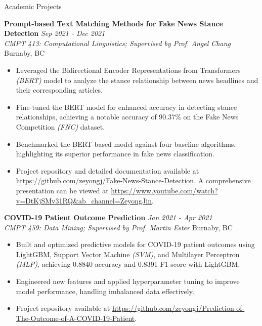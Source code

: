 \documentclass{resume} %
\begin{document}
\begin{rSection}{Academic Projects}


{\bf Prompt-based Text Matching Methods for Fake News Stance Detection} \hfill {\em Sep 2021 - Dec 2021} 
\\{\textit{CMPT 413: Computational Linguistics; Supervised by Prof. Angel Chang} \hfill {Burnaby, BC}}
\begin{itemize}
    \vspace{-0.2cm} \item Leveraged the Bidirectional Encoder Representations from Transformers \textit{(BERT)} model to analyze the stance relationship between news headlines and their corresponding articles.
    \vspace{-0.2cm} \item Fine-tuned the BERT model for enhanced accuracy in detecting stance relationships, achieving a notable accuracy of 90.37\% on the Fake News Competition \textit{(FNC)} dataset.
    \vspace{-0.2cm} \item Benchmarked the BERT-based model against four baseline algorithms, highlighting its superior performance in fake news classification.
    \vspace{-0.2cm} \item Project repository and detailed documentation available at \url{https://github.com/zeyongj/Fake-News-Stance-Detection}. A comprehensive presentation can be viewed at \url{https://www.youtube.com/watch?v=DtKjSMv31RQ&ab_channel=ZeyongJin}.
\end{itemize}

{\bf COVID-19 Patient Outcome Prediction} \hfill {\em Jan 2021 - Apr 2021}  
\\{\textit{CMPT 459: Data Mining; Supervised by Prof. Martin Ester} \hfill {Burnaby, BC}}  
\begin{itemize}
    \vspace{-0.2cm} \item Built and optimized predictive models for COVID-19 patient outcomes using LightGBM, Support Vector Machine \textit{(SVM)}, and Multilayer Perceptron \textit{(MLP)}, achieving 0.8840 accuracy and 0.8391 F1-score with LightGBM.  
    \vspace{-0.2cm} \item Engineered new features and applied hyperparameter tuning to improve model performance, handling imbalanced data effectively.  
    \vspace{-0.2cm} \item Project repository available at \url{https://github.com/zeyongj/Prediction-of-The-Outcome-of-A-COVID-19-Patient}.  
\end{itemize}


\end{rSection}
\end{document}

